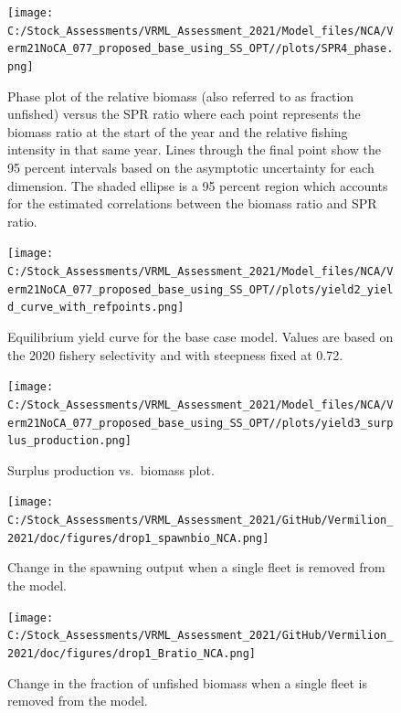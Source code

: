 \documentclass[
  english,
  a4paper,
]{article}
\begin{document}
\FloatBarrier

\begin{figure}
\centering
\texttt{[image: C:/Stock\_Assessments/VRML\_Assessment\_2021/Model\_files/NCA/Verm21NoCA\_077\_proposed\_base\_using\_SS\_OPT//plots/SPR4\_phase.png]}
\caption{Phase plot of the relative biomass (also referred to as fraction unfished) versus the SPR ratio where each point represents the biomass ratio at the start of the year and the relative fishing intensity in that same year. Lines through the final point show the 95 percent intervals based on the asymptotic uncertainty for each dimension. The shaded ellipse is a 95 percent region which accounts for the estimated correlations between the biomass ratio and SPR ratio.\label{fig:phase}}
\end{figure}

\begin{figure}
\centering
\texttt{[image: C:/Stock\_Assessments/VRML\_Assessment\_2021/Model\_files/NCA/Verm21NoCA\_077\_proposed\_base\_using\_SS\_OPT//plots/yield2\_yield\_curve\_with\_refpoints.png]}
\caption{Equilibrium yield curve for the base case model. Values are based on the 2020
fishery selectivity and with steepness fixed at 0.72.\label{fig:yield2}}
\end{figure}

\begin{figure}
\centering
\texttt{[image: C:/Stock\_Assessments/VRML\_Assessment\_2021/Model\_files/NCA/Verm21NoCA\_077\_proposed\_base\_using\_SS\_OPT//plots/yield3\_surplus\_production.png]}
\caption{Surplus production vs.~biomass plot.\label{fig:yield3}}
\end{figure}

\FloatBarrier

\begin{figure}
\centering
\texttt{[image: C:/Stock\_Assessments/VRML\_Assessment\_2021/GitHub/Vermilion\_2021/doc/figures/drop1\_spawnbio\_NCA.png]}
\caption{Change in the spawning output when a single fleet is removed from the model.\label{fig:drop-spawnbio}}
\end{figure}

\begin{figure}
\centering
\texttt{[image: C:/Stock\_Assessments/VRML\_Assessment\_2021/GitHub/Vermilion\_2021/doc/figures/drop1\_Bratio\_NCA.png]}
\caption{Change in the fraction of unfished biomass when a single fleet is removed from the model.\label{fig:drop-bratio}}
\end{figure}
\end{document}
